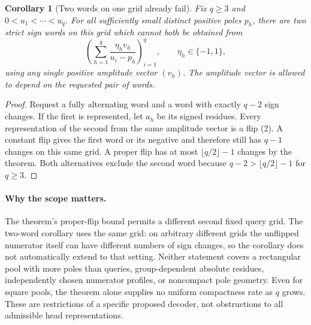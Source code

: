 \documentclass[11pt]{article}
\newtheorem{corollary}{Corollary}
\begin{document}
\begin{corollary}[Two words on one grid already fail]
Fix $q\geq3$ and $0<u_1<\cdots<u_q$. For all sufficiently small
distinct positive poles $p_h$, there are two strict sign words on
this grid which cannot both be obtained from
\[
 \left(\sum_{h=1}^q\frac{\eta_h v_h}{u_i-p_h}\right)_{i=1}^q,
 \qquad \eta_h\in\{-1,1\},
 \tag{7}
\]
using any single positive amplitude vector $(v_h)$. The amplitude
vector is allowed to depend on the requested pair of words.
\end{corollary}

\begin{proof}
Request a fully alternating word and a word with exactly $q-2$
sign changes. If the first is represented, let $a_h$ be its signed
residues. Every representation of the second from the same amplitude
vector is a flip (2). A constant flip gives the first word or its
negative and therefore still has $q-1$ changes on this same grid.
A proper flip has at most $\lfloor q/2\rfloor-1$ changes by the
theorem. Both alternatives exclude the second word because
$q-2>\lfloor q/2\rfloor-1$ for $q\geq3$.
\end{proof}

\paragraph{Why the scope matters.}
The theorem's proper-flip bound permits a different second fixed
query grid. The two-word corollary uses the same grid: on arbitrary
different grids the unflipped numerator itself can have different
numbers of sign changes, so the corollary does not automatically
extend to that setting. Neither statement covers a rectangular pool
with more poles than queries, group-dependent absolute residues,
independently chosen numerator profiles, or noncompact pole
geometry. Even for square pools, the theorem alone supplies no
uniform compactness rate as $q$ grows. These are restrictions of a
specific proposed decoder, not obstructions to all admissible head
representations.
\end{document}
